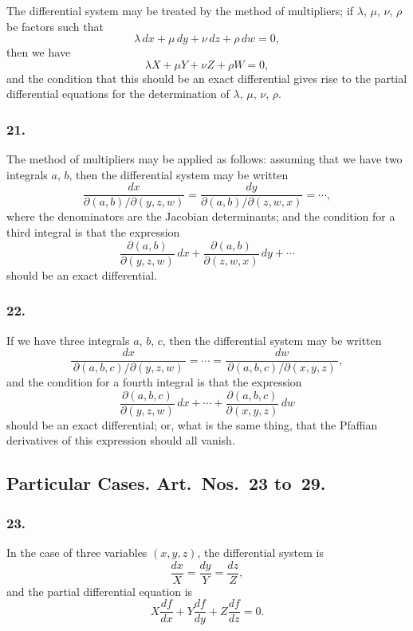 \documentclass[11pt,a4paper]{book}
\begin{document}
The differential system may be treated by the method of multipliers; if $\lambda$, $\mu$, $\nu$, $\rho$ be factors such that
\[
\lambda\,dx + \mu\,dy + \nu\,dz + \rho\,dw = 0,
\]
then we have
\[
\lambda X + \mu Y + \nu Z + \rho W = 0,
\]
and the condition that this should be an exact differential gives rise to the partial differential equations for the determination of $\lambda$, $\mu$, $\nu$, $\rho$.

\newpage
\setcounter{page}{122}

\subsubsection*{21.}

The method of multipliers may be applied as follows: assuming that we have two integrals $a$, $b$, then the differential system may be written
\[
\frac{dx}{\partial(a, b)/\partial(y, z, w)} = \frac{dy}{\partial(a, b)/\partial(z, w, x)} = \cdots,
\]
where the denominators are the Jacobian determinants; and the condition for a third integral is that the expression
\[
\frac{\partial(a, b)}{\partial(y, z, w)}\,dx + \frac{\partial(a, b)}{\partial(z, w, x)}\,dy + \cdots
\]
should be an exact differential.

\subsubsection*{22.}

If we have three integrals $a$, $b$, $c$, then the differential system may be written
\[
\frac{dx}{\,\partial(a, b, c)/\partial(y, z, w)\,} = \cdots = \frac{dw}{\,\partial(a, b, c)/\partial(x, y, z)\,},
\]
and the condition for a fourth integral is that the expression
\[
\frac{\partial(a, b, c)}{\partial(y, z, w)}\,dx + \cdots + \frac{\partial(a, b, c)}{\partial(x, y, z)}\,dw
\]
should be an exact differential; or, what is the same thing, that the Pfaffian derivatives of this expression should all vanish.

\subsection*{Particular Cases. Art.~Nos.~23 to~29.}

\subsubsection*{23.}

In the case of three variables $(x, y, z)$, the differential system is
\[
\frac{dx}{X} = \frac{dy}{Y} = \frac{dz}{Z},
\]
and the partial differential equation is
\[
X\frac{df}{dx} + Y\frac{df}{dy} + Z\frac{df}{dz} = 0.
\]
\end{document}
